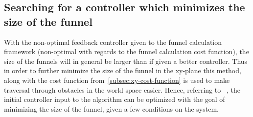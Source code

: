 \subsection{Searching for a controller which minimizes the size of the funnel}
\label{subsec:searching-for-a-controller}

With the non-optimal feedback controller given to the funnel calculation
framework (non-optimal with regards to the funnel calculation cost function),
the size of the funnels will in general be larger than if given a better
controller. Thus in order to further minimize the size of the funnel in the
xy-plane this method, along with the cost function
from~\cref{subsec:xy-cost-function} is used to make traversal through obstacles
in the world space easier. Hence, referring to
\citeauthor{majumdarFunnelLibrariesRealtime2017}~\cite[sec~4.3.2]{majumdarFunnelLibrariesRealtime2017},
the initial controller input to the algorithm can be optimized with the goal of
minimizing the size of the funnel, given a few conditions on the system.

